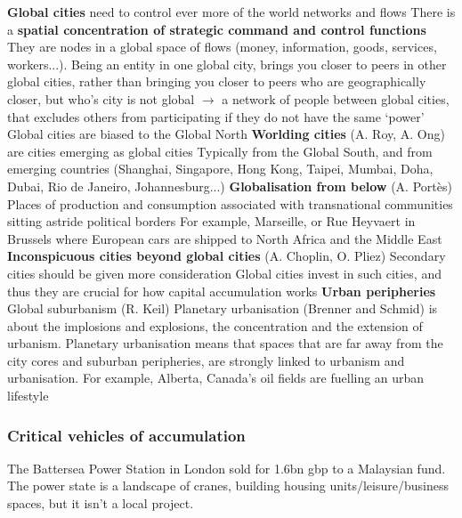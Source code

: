 \documentclass{article}
\begin{document}
\begin{outline}
	\1 \textbf{Global cities} need to control ever more of the world networks and flows
		\2 There is a \textbf{spatial concentration of strategic command and control functions}
		\2 They are nodes in a global space of flows (money, information, goods, services, workers...). Being an entity in one global city, brings you closer to peers in other global cities, rather than bringing you closer to peers who are geographically closer, but who's city is not global $\rightarrow$ a network of people between global cities, that excludes others from participating if they do not have the same `power'
		\2 Global cities are biased to the Global North
	\1 \textbf{Worlding cities} (A. Roy, A. Ong) are cities emerging as global cities
		\2 Typically from the Global South, and from emerging countries (Shanghai, Singapore, Hong Kong, Taipei, Mumbai, Doha, Dubai, Rio de Janeiro, Johannesburg...)
	\1 \textbf{Globalisation from below} (A. Portès) 
		\2 Places of production and consumption associated with transnational communities sitting astride political borders
		\2 For example, Marseille, or Rue Heyvaert in Brussels where European cars are shipped to North Africa and the Middle East
	\1 \textbf{Inconspicuous cities beyond global cities} (A. Choplin, O. Pliez)
		\2 Secondary cities should be given more consideration
		\2 Global cities invest in such cities, and thus they are crucial for how capital accumulation works
	\1 \textbf{Urban peripheries}
		\2 Global suburbanism (R. Keil)
		\2 Planetary urbanisation (Brenner and Schmid) is about the implosions and explosions, the concentration and the extension of urbanism. Planetary urbanisation means that spaces that are far away from the city cores and suburban peripheries, are strongly linked to urbanism and urbanisation. For example, Alberta, Canada's oil fields are fuelling an urban lifestyle
\end{outline}

\subsubsection{Critical vehicles of accumulation}

The Battersea Power Station in London sold for 1.6bn gbp to a Malaysian fund. The power state is a landscape of cranes, building housing units/leisure/business spaces, but it isn't a local project.
\end{document}
